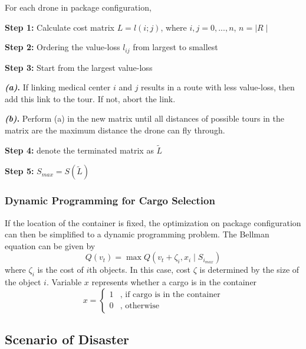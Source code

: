 \documentclass[12pt]{article}
\begin{document}
			For each drone in package configuration,\par
			\textbf{Step 1:} Calculate cost matrix $L = {l(i;j)}$, where $i,j = 0,...,n$, $n = \mid R\mid$ \par
			\textbf{Step 2:} Ordering the value-loss $l_{ij}$ from largest to smallest \par 
			\textbf{Step 3:} Start from the largest value-loss \par 
			\hspace{1.5cm}  \textbf{\textit{(a)}.} If linking medical center $i$ and $j$ results in a route with less value-loss, then add this link to the tour. If not, abort the link.\par 
			\hspace{1.5cm}  \textbf{\textit{(b)}.} Perform (a) in the new matrix until all distances of possible tours in the matrix are the maximum distance the drone can fly through. \par 
			\textbf{Step 4:} denote the terminated matrix as $\tilde{L}$ \par 
			\textbf{Step 5:} $S_{max} = S(\tilde{L})$ \par 
			 
			\subsubsection{Dynamic Programming for Cargo Selection}
			If the location of the container is fixed, the optimization on package configuration can then be simplified to a dynamic programming problem. The Bellman equation can be given by
			\begin{equation}
				Q(v_t) = \max Q(v_t+\zeta_i, x_i \mid S_{i_{max}})
			\end{equation}
			where $\zeta_i$ is the cost of $i$th objects. In this case, cost $\zeta$ is determined by the size of the object $i$. Variable $x$ represents whether a cargo is in the container
			\begin{equation}
			x = 
			\begin{cases}
			1 &\mbox{, if cargo is in the container} \\
			0 &\mbox{, otherwise}
			\end{cases}
			\end{equation}
			\par 
		
		\subsection{Scenario of Disaster}
\end{document}
